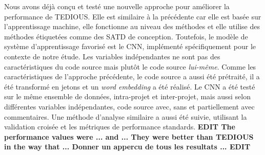 Nous avons d\'{e}j\`{a} con\c{c}u et test\'{e} une nouvelle approche pour am\'{e}liorer la performance de \ac{TEDIOUS}. Elle est similaire \`{a} la pr\'{e}c\'{e}dente car elle est bas\'{e}e sur l'apprentissage machine, elle fonctionne au niveau des m\'{e}thodes et elle utilise des m\'{e}thodes \'{e}tiquet\'{e}es comme des \ac{SATD} de conception. Toutefois, le mod\`{e}le de syst\`{e}me d'apprentissage favoris\'{e} est le \ac{CNN}, impl\'{e}ment\'{e} sp\'{e}cifiquement pour le contexte de notre \'{e}tude. Les variables ind\'{e}pendantes ne sont pas des caract\'{e}ristiques du code source mais plut\^{o}t le code source \emph{lui-m\^{e}me}. Comme les caract\'{e}ristiques de l'approche pr\'{e}c\'{e}dente, le code source a aussi \'{e}t\'{e} pr\'{e}trait\'{e}, il a \'{e}t\'{e} transform\'{e} en jetons et un \emph{word embedding} a \'{e}t\'{e} r\'{e}alis\'{e}. Le \ac{CNN} a \'{e}t\'{e} test\'{e} sur le m\^{e}me ensemble de donn\'{e}es, intra-projet et inter-projet, mais aussi selon diff\'{e}rentes variables ind\'{e}pendantes, code source avec, sans et partiellement avec commentaires. Une m\'{e}thode d'analyse similaire a aussi \'{e}t\'{e} suivie, utilisant la validation crois\'{e}e et les m\'{e}triques de performance standards. \textbf{EDIT The performance values were ... and ... They were better than \ac{TEDIOUS} in the way that ... Donner un appercu de tous les resultats ... EDIT}


